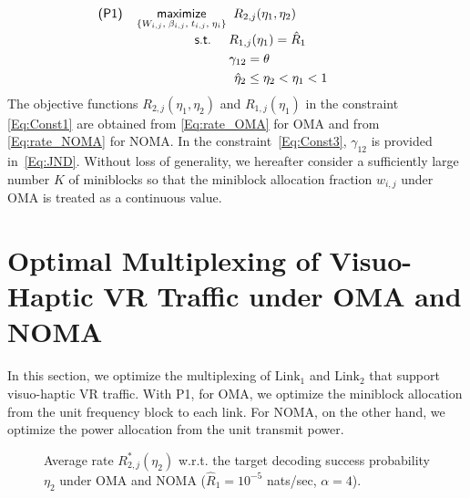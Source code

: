 \documentclass[conference]{IEEEtran}
\def\[{\left[}
\def\R{{\hat{R}_1}}
\def\L{\text{Link}}
\def\figwidth{8.5 cm}
\begin{document}
\vspace{-10pt}\small\begin{subequations}
\begin{align}
\hspace{-1.3cm}\textsf{(P1)} \;\;\;\; \underset{\{W_{i,j},\; \beta_{i,j},\; t_{i,j},\; \eta_i\} }{\textsf{maximize}}&\;\; R_{2,j}(\eta_1,\eta_2)\\[-1mm]
&\hspace{-25pt}\textsf{s.t.}\;\;\;\;\; R_{1,j}(\eta_1) = \R  \label{Eq:Const1}\\
&\hspace{-9pt}\;\;\;\; \gamma_{12} = \theta \label{Eq:Const3}\\
&\hspace{-5pt}\;\;\;\; \hat{\eta}_2\leq \eta_2 < \eta_1 < 1 \label{Eq:Const4}
\end{align}
\end{subequations}\normalsize
The objective functions $R_{2,j}(\eta_1,\eta_2)$ and $R_{1,j}(\eta_1)$ in the constraint \eqref{Eq:Const1} are obtained from \eqref{Eq:rate_OMA} for OMA and from \eqref{Eq:rate_NOMA} for NOMA. In the constraint~\eqref{Eq:Const3}, $\gamma_{12}$ is provided in~\eqref{Eq:JND}. Without loss of generality, we hereafter consider a sufficiently large number $K$ of miniblocks so that the miniblock allocation fraction $w_{i,j}$ under OMA is treated as a continuous value.



\section{Optimal Multiplexing of Visuo-Haptic VR Traffic under OMA and NOMA}
In this section, we optimize the multiplexing of $\L_1$ and $\L_2$ that support visuo-haptic VR traffic.
With \textsf{P1}, for OMA, we optimize the miniblock allocation from the unit frequency block to each link. For NOMA, on the other hand, we optimize the power allocation from the unit transmit power.


\begin{figure*}
\centering
{}\hspace{15pt}
\caption{\small Average rate $R_{2,j}^*(\eta_2)$ w.r.t. the target decoding success probability $\eta_2$ under OMA and NOMA ($\R=10^{-5}$ nats/sec, $\alpha=4$).}
\end{figure*}
\end{document}
